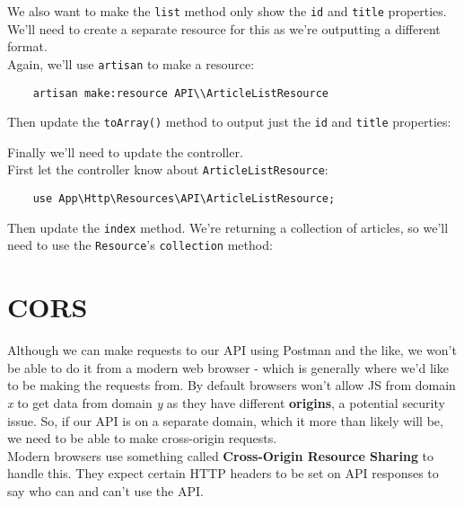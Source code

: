 We also want to make the \texttt{list} method only show the \texttt{id} and \texttt{title} properties. We'll need to create a separate resource for this as we're outputting a different format.
\\

Again, we'll use \texttt{artisan} to make a resource:

\begin{verbatim}
    artisan make:resource API\\ArticleListResource
\end{verbatim}

Then update the \texttt{toArray()} method to output just the \texttt{id} and \texttt{title} properties:


Finally we'll need to update the controller.
\\

First let the controller know about \texttt{ArticleListResource}:

\begin{verbatim}
    use App\Http\Resources\API\ArticleListResource;
\end{verbatim}

Then update the \texttt{index} method. We're returning a collection of articles, so we'll need to use the \texttt{Resource}'s \texttt{collection} method:




\section{CORS}

Although we can make requests to our API using Postman and the like, we won't be able to do it from a modern web browser - which is generally where we'd like to be making the requests from. By default browsers won't allow JS from domain \textit{x} to get data from domain \textit{y} as they have different \textbf{origins}, a potential security issue. So, if our API is on a separate domain, which it more than likely will be, we need to be able to make cross-origin requests.
\\

Modern browsers use something called \textbf{Cross-Origin Resource Sharing} to handle this. They expect certain HTTP headers to be set on API responses to say who can and can't use the API.
\\

